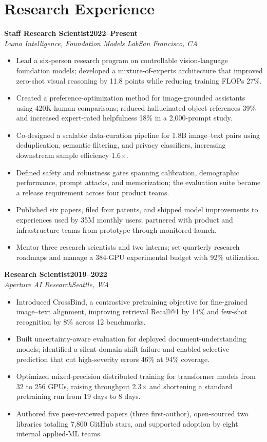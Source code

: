 \documentclass[10pt,letterpaper]{article}
\newcommand{\entry}[4]{%
  \textbf{#1}\hfill\textbf{#2}\\[-1pt]
  \textit{\color{Signal}#3}\hfill\textit{\color{Slate}#4}\par
}
\begin{document}
\section*{Research Experience}
\entry{Staff Research Scientist}{2022--Present}{Luma Intelligence, Foundation Models Lab}{San Francisco, CA}
\begin{itemize}
  \item Lead a six-person research program on controllable vision-language foundation models; developed a mixture-of-experts architecture that improved zero-shot visual reasoning by 11.8 points while reducing training FLOPs 27\%.
  \item Created a preference-optimization method for image-grounded assistants using 420K human comparisons; reduced hallucinated object references 39\% and increased expert-rated helpfulness 18\% in a 2,000-prompt study.
  \item Co-designed a scalable data-curation pipeline for 1.8B image--text pairs using deduplication, semantic filtering, and privacy classifiers, increasing downstream sample efficiency 1.6$\times$.
  \item Defined safety and robustness gates spanning calibration, demographic performance, prompt attacks, and memorization; the evaluation suite became a release requirement across four product teams.
  \item Published six papers, filed four patents, and shipped model improvements to experiences used by 35M monthly users; partnered with product and infrastructure teams from prototype through monitored launch.
  \item Mentor three research scientists and two interns; set quarterly research roadmaps and manage a 384-GPU experimental budget with 92\% utilization.
\end{itemize}

\entry{Research Scientist}{2019--2022}{Aperture AI Research}{Seattle, WA}
\begin{itemize}
  \item Introduced CrossBind, a contrastive pretraining objective for fine-grained image--text alignment, improving retrieval Recall@1 by 14\% and few-shot recognition by 8\% across 12 benchmarks.
  \item Built uncertainty-aware evaluation for deployed document-understanding models; identified a silent domain-shift failure and enabled selective prediction that cut high-severity errors 46\% at 94\% coverage.
  \item Optimized mixed-precision distributed training for transformer models from 32 to 256 GPUs, raising throughput 2.3$\times$ and shortening a standard pretraining run from 19 days to 8 days.
  \item Authored five peer-reviewed papers (three first-author), open-sourced two libraries totaling 7,800 GitHub stars, and supported adoption by eight internal applied-ML teams.
\end{itemize}
\end{document}
